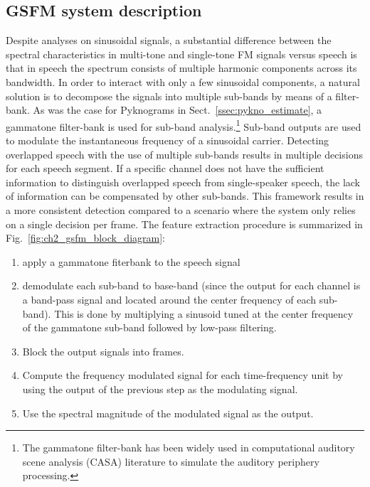 {\subsection{GSFM system description}
Despite analyses on sinusoidal signals, a substantial difference between the spectral characteristics in multi-tone and single-tone FM signals versus speech is that in speech the spectrum consists of multiple harmonic components across its bandwidth. 
In order to interact with only a few sinusoidal components, a natural solution is to decompose the signals into multiple sub-bands by means of a filter-bank. 
As was the case for Pyknograms in Sect.~\ref{ssec:pykno_estimate}, a gammatone filter-bank is used for sub-band analysis.\footnote{The gammatone filter-bank has been widely used in computational auditory scene analysis (CASA) literature to simulate the auditory periphery processing.} 
Sub-band outputs are used to modulate the instantaneous frequency of a sinusoidal carrier. 
Detecting overlapped speech with the use of multiple sub-bands results in multiple decisions for each speech segment. 
If a specific channel does not have the sufficient information to distinguish overlapped speech from single-speaker speech, the lack of information can be compensated by other sub-bands. 
This framework results in a more consistent detection compared to a scenario where the system only relies on a single decision per frame. 
The feature extraction procedure is summarized in Fig.~\ref{fig:ch2_gsfm_block_diagram}:

\begin{enumerate}
	\item apply a gammatone fiterbank to the speech signal
	\item demodulate each sub-band to base-band (since the output for each channel is a band-pass signal and located around the center frequency of each sub-band). 
	This is done by	multiplying a sinusoid tuned at the center frequency of	the gammatone sub-band followed by low-pass filtering.
	\item Block the output signals into frames. 
	\item Compute the frequency modulated signal for each time-frequency unit by using the output of the previous step as the modulating signal. 
	\item Use the spectral magnitude of the modulated signal as the output.
\end{enumerate}

}
